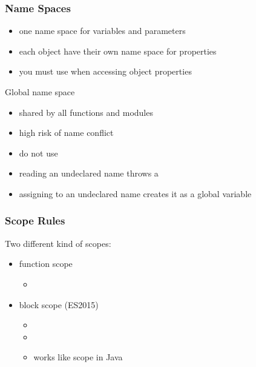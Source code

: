 \begin{frame}[fragile] \frametitle{Name Spaces}
\begin{itemize}
 \item one name space for variables and parameters
 \item each object have their own name space for properties
 \item you must use  when accessing object properties
\end{itemize}
\vspace{3mm}
Global name space
\begin{itemize}
  \item shared by all functions and modules
  \item high risk of name conflict
  \item do not use
\end{itemize}
\vspace{3mm}
\begin{itemize}
  \item reading an undeclared name throws a 
  \item assigning to an undeclared name creates it as a global variable
\end{itemize}
\end{frame}

\begin{frame}[fragile] \frametitle{Scope Rules}
Two different kind of scopes:
\begin{itemize}
  \item  function scope
  \begin{itemize}
    \item {}
  \end{itemize}
  \item block scope (ES2015)
  \begin{itemize}
    \item {}
    \item {}
    \item works like scope in Java
  \end{itemize}
\end{itemize}
\vspace{4mm}

\end{frame}

